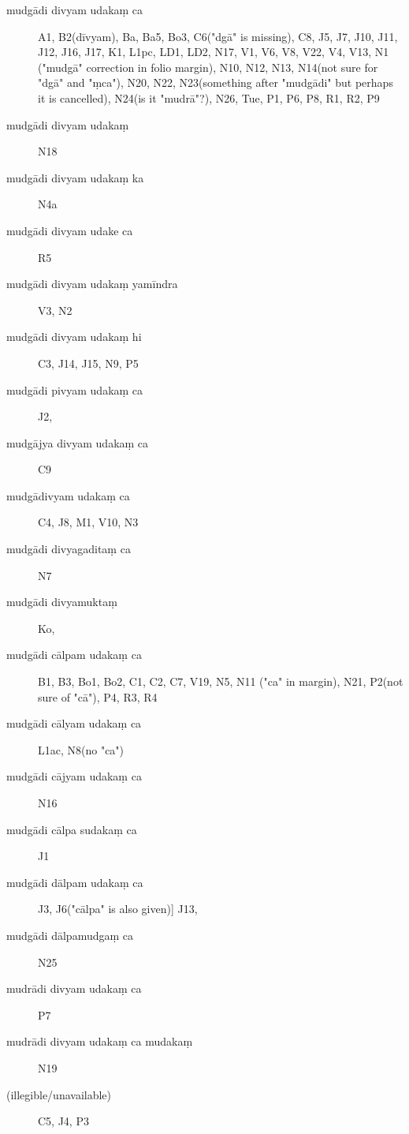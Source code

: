 \begin{ekdosis}
\begin{marma}[hp01_055]
         
\begin{marma}[hp01_062]
 \begin{description}
 \item[mudgādi divyam udakaṃ ca] A1, B2(dīvyam), Ba, Ba5, Bo3, C6("dgā" is missing), C8, J5, J7, J10, J11, J12, J16, J17, K1, L1pc, LD1, LD2, N17, V1, V6, V8, V22, V4, V13, N1 ("mudgā" correction in folio margin), N10, N12, N13, N14(not sure for "dgā" and "ṃca"), N20, N22, N23(something after "mudgādi" but perhaps it is cancelled), N24(is it "mudrā"?), N26, Tue, P1, P6, P8, R1, R2, P9
\item[mudgādi divyam udakaṃ]   N18
\item[mudgādi divyam udakaṃ ka]   N4a
\item[mudgādi divyam udake ca]   R5
\item[mudgādi divyam udakaṃ yamīndra]        V3, N2
\item[mudgādi divyam udakaṃ hi]        C3, J14, J15, N9, P5
\item[mudgādi pivyam udakaṃ ca]        J2,
\item[mudgājya divyam udakaṃ ca]        C9
\item[mudgādivyam udakaṃ ca]        C4, J8, M1, V10, N3
\item[mudgādi divyagaditaṃ ca]   N7
\item[mudgādi divyamuktaṃ]        Ko,
\item[mudgādi cālpam udakaṃ ca]        B1, B3, Bo1, Bo2, C1, C2, C7, V19, N5, N11 ("ca" in margin), N21, P2(not sure of "cā"), P4, R3, R4
\item[mudgādi cālyam udakaṃ ca]        L1ac, N8(no "ca")
\item[mudgādi cājyam udakaṃ ca]        N16
\item[mudgādi cālpa sudakaṃ ca]         J1
\item[mudgādi dālpam udakaṃ ca]        J3, J6("cālpa" is also given)] J13,
\item[mudgādi dālpamudgaṃ ca]        N25
\item[mudrādi divyam udakaṃ ca]  P7
\item[mudrādi divyam udakaṃ ca mudakaṃ]        N19
\item[(illegible/unavailable)]       C5, J4, P3
        \end{description}


\end{marma}
\end{marma}
\end{ekdosis}
